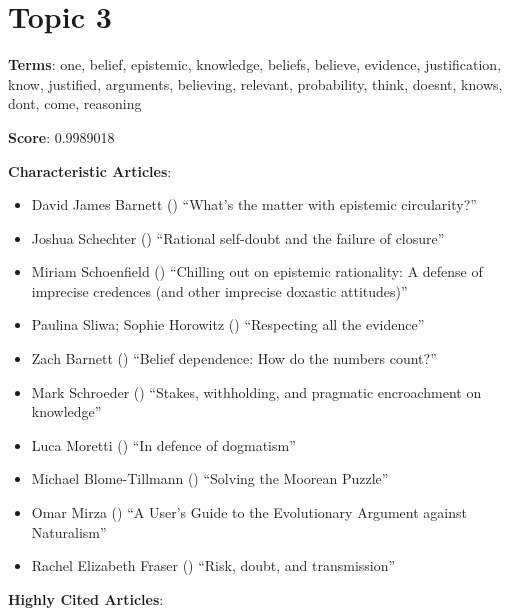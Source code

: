 \documentclass[
  10pt,
  letterpaper,
  DIV=11,
  numbers=noendperiod,
  twoside]{scrartcl}
\providecommand{\tightlist}{%
  \setlength{\itemsep}{0pt}\setlength{\parskip}{0pt}}\usepackage{longtable,booktabs,array}
\begin{document}
\section{Topic 3}\label{topic-3}

\textbf{Terms}: one, belief, epistemic, knowledge, beliefs, believe,
evidence, justification, know, justified, arguments, believing,
relevant, probability, think, doesnt, knows, dont, come, reasoning

\textbf{Score}: 0.9989018

\textbf{Characteristic Articles}:

\begin{itemize}
\tightlist
\item
  David James Barnett () ``What's
  the matter with epistemic circularity?''
\item
  Joshua Schechter () ``Rational
  self-doubt and the failure of closure''
\item
  Miriam Schoenfield ()
  ``Chilling out on epistemic rationality: A defense of imprecise
  credences (and other imprecise doxastic attitudes)''
\item
  Paulina Sliwa; Sophie Horowitz
  () ``Respecting all the
  evidence''
\item
  Zach Barnett () ``Belief
  dependence: How do the numbers count?''
\item
  Mark Schroeder () ``Stakes,
  withholding, and pragmatic encroachment on knowledge''
\item
  Luca Moretti () ``In defence of
  dogmatism''
\item
  Michael Blome-Tillmann ()
  ``Solving the Moorean Puzzle''
\item
  Omar Mirza () ``A User's Guide
  to the Evolutionary Argument against Naturalism''
\item
  Rachel Elizabeth Fraser ()
  ``Risk, doubt, and transmission''
\end{itemize}

\textbf{Highly Cited Articles}:
\end{document}
